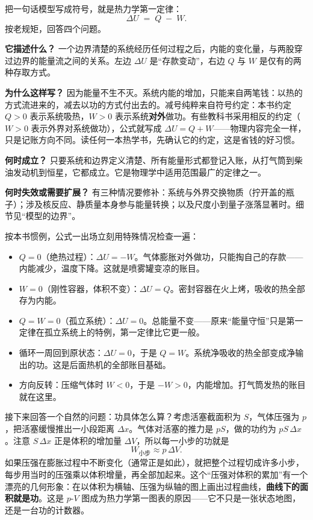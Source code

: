\begin{mainline}
把一句话模型写成符号，就是热力学第一定律：
\[
  \Delta U \;=\; Q \;-\; W .
\]
按老规矩，回答四个问题。

\textbf{它描述什么？} 一个边界清楚的系统经历任何过程之后，内能的变化量，与两股穿过边界的能量流之间的关系。左边 \(\Delta U\) 是“存款变动”，右边 \(Q\) 与 \(W\) 是仅有的两种存取方式。

\textbf{为什么这样写？} 因为能量不生不灭。系统内能的增加，只能来自两笔钱：以热的方式流进来的，减去以功的方式付出去的。减号纯粹来自符号约定：本书约定 \(Q>0\) 表示系统吸热，\(W>0\) 表示系统\textbf{对外}做功。有些教科书采用相反的约定（\(W>0\) 表示外界对系统做功），公式就写成 \(\Delta U=Q+W\)——物理内容完全一样，只是记账方向不同。读任何一本热学书，先确认它的约定，这是省钱的好习惯。

\textbf{何时成立？} 只要系统和边界定义清楚、所有能量形式都登记入账，从打气筒到柴油发动机到恒星，它都成立。它是物理学中适用范围最广的定律之一。

\textbf{何时失效或需要扩展？} 有三种情况要修补：系统与外界交换物质（拧开盖的瓶子）；涉及核反应、静质量本身参与能量转换；以及尺度小到量子涨落显著时。细节见“模型的边界”。

按本书惯例，公式一出场立刻用特殊情况检查一遍：

\begin{itemize}
  \item \(Q=0\)（绝热过程）：\(\Delta U=-W\)。气体膨胀对外做功，只能掏自己的存款——内能减少，温度下降。这就是喷雾罐变凉的账目。
  \item \(W=0\)（刚性容器，体积不变）：\(\Delta U=Q\)。密封容器在火上烤，吸收的热全部存为内能。
  \item \(Q=W=0\)（孤立系统）：\(\Delta U=0\)。总能量不变——原来“能量守恒”只是第一定律在孤立系统上的特例，第一定律比它更一般。
  \item 循环一周回到原状态：\(\Delta U=0\)，于是 \(Q=W\)。系统净吸收的热全部变成净输出的功。这是后面热机的全部账目基础。
  \item 方向反转：压缩气体时 \(W<0\)，于是 \(-W>0\)，内能增加。打气筒发热的账目就在这里。
\end{itemize}

接下来回答一个自然的问题：功具体怎么算？考虑活塞截面积为 \(S\)，气体压强为 \(p\)，把活塞缓慢推出一小段距离 \(\Delta x\)。气体对活塞的推力是 \(pS\)，做的功约为 \(pS\,\Delta x\)。注意 \(S\,\Delta x\) 正是体积的增加量 \(\Delta V\)，所以每一小步的功就是
\[
  W_{\text{小步}} \approx p\,\Delta V .
\]
如果压强在膨胀过程中不断变化（通常正是如此），就把整个过程切成许多小步，每步用当时的压强乘以体积增量，再全部加起来。这个“压强对体积的累加”有一个漂亮的几何形象：在以体积为横轴、压强为纵轴的图上画出过程曲线，\textbf{曲线下的面积就是功}。这是 \(p\)-\(V\) 图成为热力学第一图表的原因——它不只是一张状态地图，还是一台功的计数器。
\end{mainline}

